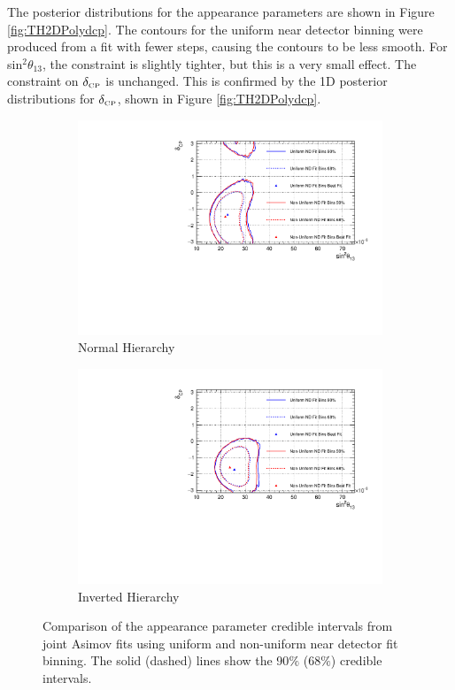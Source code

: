The posterior distributions for the appearance parameters are shown in Figure \ref{fig:TH2DPolydcp}. The contours for the uniform near detector binning were produced from a fit with fewer steps, causing the contours to be less smooth. For sin$^2\theta_{13}$, the constraint is slightly tighter, but this is a very small effect. The constraint on $\delta_{\scriptscriptstyle\mathrm{CP}}$ is unchanged. This is confirmed by the 1D posterior distributions for $\delta_{\scriptscriptstyle\mathrm{CP}}$, shown in Figure \ref{fig:TH2DPolydcp}.

\begin{figure}[!htbp]
\centering
\begin{subfigure}{.7\textwidth}
  \centering
  \includegraphics[width=0.95\linewidth]{figs/compMaCh3Contours_TH2DvsTHPoly_asimov/compMaCh3Contours_TH2DvsTHPoly_app_asimovA_NH}
  \caption{Normal Hierarchy}
  \label{fig:TH2DPolyAppNH}
\end{subfigure}
\begin{subfigure}{.7\textwidth}
  \centering
  \includegraphics[width=0.95\linewidth]{figs/compMaCh3Contours_TH2DvsTHPoly_asimov/compMaCh3Contours_TH2DvsTHPoly_app_asimovA_IH}
  \caption{Inverted Hierarchy}
  \label{fig:TH2DPolyAppIH}
\end{subfigure}
\caption{Comparison of the appearance parameter credible intervals from joint Asimov fits using uniform and non-uniform near detector fit binning. The solid (dashed) lines show the 90$\%$ ($68\%$) credible intervals.}
\label{fig:TH2DPolyApp}
\end{figure}

